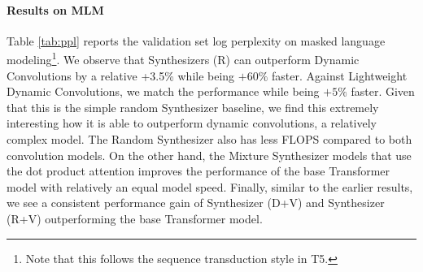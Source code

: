 \documentclass{article}
\begin{document}
\paragraph{Results on MLM} Table \ref{tab:ppl} reports the validation set log perplexity on masked language modeling\footnote{Note that this follows the sequence transduction style in T5.}. We observe that Synthesizers (R) can outperform Dynamic Convolutions by a relative +3.5\% while being $+60\%$ faster. Against Lightweight Dynamic Convolutions, we match the performance while being $+5\%$ faster. Given that this is the simple random Synthesizer baseline, we find this extremely interesting how it is able to outperform dynamic convolutions, a relatively complex model. The Random Synthesizer also has less FLOPS compared to both convolution models. On the other hand, the Mixture Synthesizer models that use the dot product attention improves the performance of the base Transformer model with relatively an equal model speed. Finally, similar to the earlier results, we see a consistent performance gain of Synthesizer (D+V) and Synthesizer (R+V) outperforming the base Transformer model.
\end{document}
